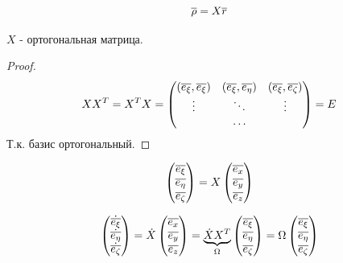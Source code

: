   $$ {\overline{\rho}} = X {\overline{r}} $$
  
  \begin{ass}
  $X$ - ортогональная матрица.
  \end{ass}
  \begin{proof}
  $$ XX^T = X^TX = 
  \left(
  \begin{matrix}
  ({\overline{e_{\xi}}}, {\overline{e_\xi}}) & 
  ({\overline{e_{\xi}}}, {\overline{e_\eta}}) & 
  ({\overline{e_{\xi}}}, {\overline{e_\zeta}}) \\
  \vdots & \ddots & \vdots \\
   & \ldots &
  \end{matrix} 
  \right)
  = E $$
  Т.к. базис ортогональный.
  \end{proof} 
  
  $$
  \left(
  \begin{matrix}
  {\overline{e_{\xi}}} \\
  {\overline{e_{\eta}}} \\
  {\overline{e_{\zeta}}} \\
  \end{matrix}
  \right)  
  =  
  X
  \left(
  \begin{matrix}
  {\overline{e_{x}}} \\
  {\overline{e_{y}}} \\
  {\overline{e_{z}}} \\
  \end{matrix}
  \right)
  $$

  $$
  \left(
  \begin{matrix}
  \dot{{\overline{e_{\xi}}}} \\
  \dot{{\overline{e_{\eta}}}} \\
  \dot{{\overline{e_{\zeta}}}} \\  
  \end{matrix}
  \right)
  = 
  \dot{X}
  \left(
  \begin{matrix}
  {\overline{e_{x}}} \\
  {\overline{e_{y}}} \\
  {\overline{e_{z}}} \\
  \end{matrix}
  \right) =
  \underbrace{
  \dot{X} X^T
  }_{\Omega}
  \left(
  \begin{matrix}
  {\overline{e_{\xi}}} \\
  {\overline{e_{\eta}}} \\
  {\overline{e_{\zeta}}} \\
  \end{matrix}
  \right)
  =
  \Omega
  \left(
  \begin{matrix}
  {\overline{e_{\xi}}} \\
  {\overline{e_{\eta}}} \\
  {\overline{e_{\zeta}}} \\
  \end{matrix}
  \right) 
  $$

